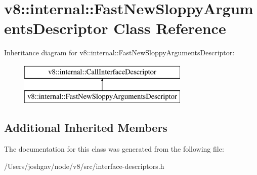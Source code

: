 \hypertarget{classv8_1_1internal_1_1_fast_new_sloppy_arguments_descriptor}{}\section{v8\+:\+:internal\+:\+:Fast\+New\+Sloppy\+Arguments\+Descriptor Class Reference}
\label{classv8_1_1internal_1_1_fast_new_sloppy_arguments_descriptor}
Inheritance diagram for v8\+:\+:internal\+:\+:Fast\+New\+Sloppy\+Arguments\+Descriptor\+:\begin{figure}[H]
\begin{center}
\leavevmode
\includegraphics[height=2.000000cm]{classv8_1_1internal_1_1_fast_new_sloppy_arguments_descriptor}
\end{center}
\end{figure}
\subsection*{Additional Inherited Members}


The documentation for this class was generated from the following file\+:\begin{DoxyCompactItemize}
\item 
/\+Users/joshgav/node/v8/src/interface-\/descriptors.\+h\end{DoxyCompactItemize}

